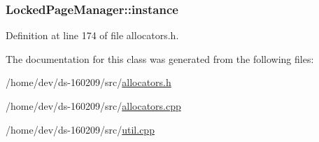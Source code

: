 \subsubsection[{instance}]{ Locked\+Page\+Manager\+::instance\hspace{0.3cm}{\ttfamily [static]}}\label{class_locked_page_manager_aedd82df65c12c1d83d43ac8500c57fcf}


Definition at line 174 of file allocators.\+h.



The documentation for this class was generated from the following files\+:\begin{DoxyCompactItemize}
\item 
/home/dev/ds-\/160209/src/\hyperlink{allocators_8h}{allocators.\+h}\item 
/home/dev/ds-\/160209/src/\hyperlink{allocators_8cpp}{allocators.\+cpp}\item 
/home/dev/ds-\/160209/src/\hyperlink{util_8cpp}{util.\+cpp}\end{DoxyCompactItemize}
